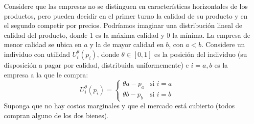 \question Considere que las empresas no se distinguen en características horizontales de los productos, pero pueden decidir en el primer turno la calidad de su producto y en el segundo competir por precios. Podríamos imaginar una distribución lineal de calidad del producto, donde 1 es la máxima calidad y 0 la mínima. La empresa de menor calidad se ubica en $a$ y la de mayor calidad en $b$, con $a < b$. Considere un individuo con utilidad $U_i^\theta(p_i)$, donde $\theta \in [0,1]$ es la posición del individuo (su disposición a pagar por calidad, distribuida uniformemente) e $i = a,b$ es la empresa a la que le compra:
\[
  U_i^\theta(p_i) =
  \begin{cases}
    \theta a - p_a & \text{si } i = a \\
    \theta b - p_b & \text{si } i = b
  \end{cases}
\]
Suponga que no hay costos marginales y que el mercado está cubierto (todos compran alguno de los dos bienes).
